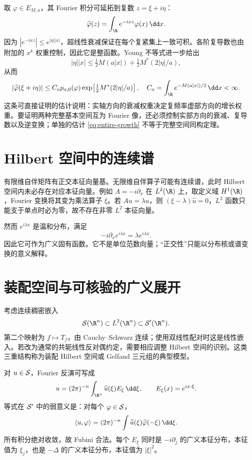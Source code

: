 取 $\varphi\in E_{M,a}$，其 Fourier 积分可延拓到复数 $z=\xi+i\eta$：
\[
 \widehat\varphi(z)=\int_\R e^{-ixz}\varphi(x)\,\dd x.
\]
因为 $|e^{-ixz}|\le e^{|\eta||x|}$，超线性衰减保证在每个复紧集上一致可积。各阶复导数也由附加的 $x^k$ 权重控制，因此它是整函数。Young 不等式进一步给出
\[
 |\eta||x|\le\tfrac12M(a|x|)+\tfrac12M^*(2|\eta|/a),
\]
从而
\begin{equation}\label{eq:entire-growth}
 |\widehat\varphi(\xi+i\eta)|\le C_a p_{a,0}(\varphi)
 \exp\!\left[\tfrac12M^*(2|\eta|/a)\right],
 \quad C_a=\int_\R e^{-M(a|x|)/2}\,\dd x<\infty.
\end{equation}
这条可直接证明的估计说明：实轴方向的衰减权重决定复频率虚部方向的增长权重。要证明两种完整基本空间互为 Fourier 像，还必须控制实部方向的衰减、复导数以及逆变换；单独的估计 \eqref{eq:entire-growth} 不等于完整空间同构定理。

\section{Hilbert 空间中的连续谱}
有限维自伴矩阵有正交本征向量基。无限维自伴算子可能有连续谱，此时 Hilbert 空间内未必存在对应本征向量。例如 $A=-i\partial_x$ 在 $L^2(\R)$ 上，取定义域 $H^1(\R)$，Fourier 变换将其变为乘法算子 $\xi$。若 $Au=\lambda u$，则 $(\xi-\lambda)\widehat u=0$，$L^2$ 函数只能支于单点时必为零，故不存在非零 $L^2$ 本征向量。

然而 $e^{i\lambda x}$ 是温和分布，满足
\[
 -i\partial_xe^{i\lambda x}=\lambda e^{i\lambda x}.
\]
因此它可作为广义固有函数。它不是单位范数向量；“正交性”只能以分布核或谱变换的意义解释。

\section{装配空间与可核验的广义展开}
考虑连续稠密嵌入
\[
 \Sch(\R^n)\subset L^2(\R^n)\subset\Temp(\R^n).
\]
第二个映射为 $f\mapsto T_f$，由 Cauchy--Schwarz 连续；使用双线性配对时这是线性嵌入。若改为通常的共轭线性反对偶约定，需要相应调整 Hilbert 空间的识别。这类三重结构称为装配 Hilbert 空间或 Gelfand 三元组的典型模型。

对 $u\in\mathcal{S}$，Fourier 反演可写成
\begin{equation}\label{eq:generalized-expansion}
 u=(2\pi)^{-n}\int_{\R^n}\widehat u(\xi)E_\xi\,\dd\xi,
 \qquad E_\xi(x)=e^{ix\cdot\xi}.
\end{equation}
等式在 $\mathcal{S}'$ 中的弱意义是：对每个 $\varphi\in\mathcal{S}$，
\[
 \Pair{u}{\varphi}=(2\pi)^{-n}
 \int\widehat u(\xi)\widehat\varphi(-\xi)\,\dd\xi.
\]
所有积分绝对收敛，故 Fubini 合法。每个 $E_\xi$ 同时是 $-i\partial_j$ 的广义本征分布，本征值为 $\xi_j$，也是 $-\Delta$ 的广义本征分布，本征值为 $|\xi|^2$。

